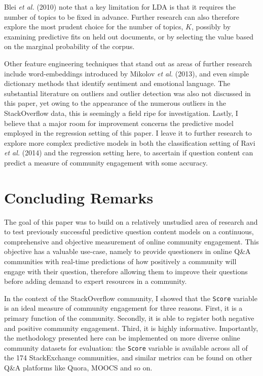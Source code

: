\documentclass[11pt,preprint, authoryear]{article}
\begin{document}
Blei \emph{et al.} (2010) note that a key limitation for LDA is that it
requires the number of topics to be fixed in advance. Further research
can also therefore explore the most prudent choice for the number of
topics, \(K\), possibly by examining predictive fits on held out
documents, or by selecting the value based on the marginal probability
of the corpus.

Other feature engineering techniques that stand out as areas of further
research include word-embeddings introduced by Mikolov \emph{et al.}
(2013), and even simple dictionary methods that identify sentiment and
emotional language. The substantial literature on outliers and outlier
detection was also not discussed in this paper, yet owing to the
appearance of the numerous outliers in the StackOverflow data, this is
seemingly a field ripe for investigation. Lastly, I believe that a major
room for improvement concerns the predictive model employed in the
regression setting of this paper. I leave it to further research to
explore more complex predictive models in both the classification
setting of Ravi \emph{et al.} (2014) and the regression setting here, to
ascertain if question content can predict a measure of community
engagement with some accuracy.

\newpage

\section{\texorpdfstring{Concluding Remarks
\label{Concl}}{Concluding Remarks }}\label{concluding-remarks}

The goal of this paper was to build on a relatively unstudied area of
research and to test previously successful predictive question content
models on a continuous, comprehensive and objective measurement of
online community engagement. This objective has a valuable use-case,
namely to provide questioners in online Q\&A communities with real-time
predictions of how positively a community will engage with their
question, therefore allowing them to improve their questions before
adding demand to expert resources in a community.

In the context of the StackOverflow community, I showed that the
\texttt{Score} variable is an ideal measure of community engagement for
three reasons. First, it is a primary function of the community.
Secondly, it is able to register both negative and positive community
engagement. Third, it is highly informative. Importantly, the
methodology presented here can be implemented on more diverse online
community datasets for evaluation: the \texttt{Score} variable is
available across all of the 174 StackExchange communities, and similar
metrics can be found on other Q\&A platforms like Quora, MOOCS and so
on.
\end{document}

